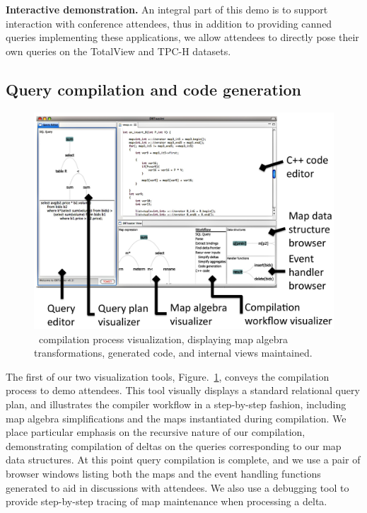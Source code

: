 \smallskip
\noindent\textbf{Interactive demonstration.}
An integral part of this demo is to support interaction with conference
attendees, thus in addition to providing canned queries implementing these
applications, we allow attendees to directly pose their own queries on
the TotalView and TPC-H datasets.



\subsection{Query compilation and code generation}

\begin{figure}[tb]
\begin{center}
\includegraphics[scale=0.088]{figures/dbt-gui}
\end{center}

\vspace{-4mm}

\caption{\compiler\ compilation process visualization, displaying map algebra
transformations, generated code, and internal views maintained.}
\label{fig:compilegui}

\vspace{-2mm}
\end{figure}

The first of our two visualization tools, Figure.~\ref{fig:compilegui}, conveys
the compilation process to demo attendees. This tool visually displays a standard
relational query plan, and illustrates the compiler workflow in a step-by-step
fashion, including map algebra simplifications and the maps instantiated during
compilation. We place particular emphasis on the recursive nature of our
compilation, demonstrating compilation of deltas on the queries corresponding to
our map data structures. At this point query compilation is complete, and we use
a pair of browser windows listing both the maps and the event handling functions
generated to aid in discussions with attendees. We also use a debugging tool to
provide step-by-step tracing of map maintenance when processing a delta.

